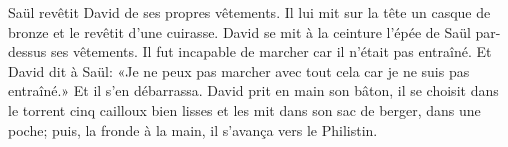 Saül revêtit David de ses propres vêtements.
	Il lui mit sur la tête un casque de bronze et le revêtit d’une cuirasse.
David se mit à la ceinture l’épée de Saül par-dessus ses vêtements.
	Il fut incapable de marcher car il n’était pas entraîné.
Et David dit à Saül: «Je ne peux pas marcher avec tout cela
	car je ne suis pas entraîné.»
	Et il s’en débarrassa.
David prit en main son bâton,
	il se choisit dans le torrent cinq cailloux bien lisses
	et les mit dans son sac de berger, dans une poche;
	puis, la fronde à la main, il s’avança vers le Philistin.
